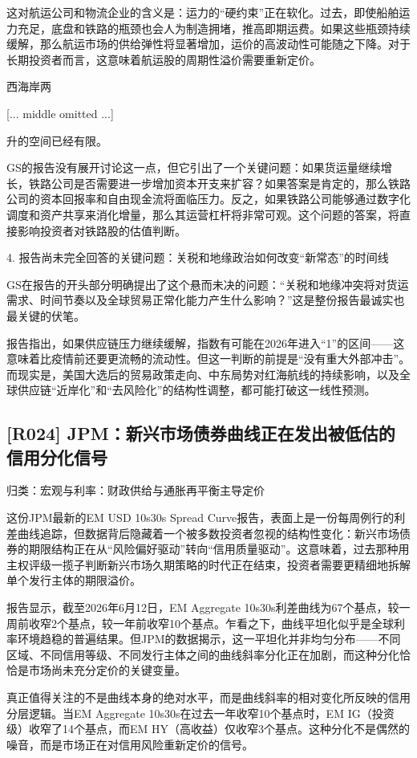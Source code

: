 \documentclass[11pt]{ctexart}
\begin{document}
这对航运公司和物流企业的含义是：运力的“硬约束”正在软化。过去，即使船舶运力充足，底盘和铁路的瓶颈也会人为制造拥堵，推高即期运费。如果这些瓶颈持续缓解，那么航运市场的供给弹性将显著增加，运价的高波动性可能随之下降。对于长期投资者而言，这意味着航运股的周期性溢价需要重新定价。

西海岸两

[... middle omitted ...]

升的空间已经有限。

GS的报告没有展开讨论这一点，但它引出了一个关键问题：如果货运量继续增长，铁路公司是否需要进一步增加资本开支来扩容？如果答案是肯定的，那么铁路公司的资本回报率和自由现金流将面临压力。反之，如果铁路公司能够通过数字化调度和资产共享来消化增量，那么其运营杠杆将非常可观。这个问题的答案，将直接影响投资者对铁路股的估值判断。

4. 报告尚未完全回答的关键问题：关税和地缘政治如何改变“新常态”的时间线

GS在报告的开头部分明确提出了这个悬而未决的问题：“关税和地缘冲突将对货运需求、时间节奏以及全球贸易正常化能力产生什么影响？”这是整份报告最诚实也最关键的伏笔。

报告指出，如果供应链压力继续缓解，指数有可能在2026年进入“1”的区间——这意味着比疫情前还要更流畅的流动性。但这一判断的前提是“没有重大外部冲击”。而现实是，美国大选后的贸易政策走向、中东局势对红海航线的持续影响，以及全球供应链“近岸化”和“去风险化”的结构性调整，都可能打破这一线性预测。

\subsection{[R024] JPM：新兴市场债券曲线正在发出被低估的信用分化信号}
{\small\color{refgray}归类：宏观与利率：财政供给与通胀再平衡主导定价}

这份JPM最新的EM USD 10s30s Spread Curve报告，表面上是一份每周例行的利差曲线追踪，但数据背后隐藏着一个被多数投资者忽视的结构性变化：新兴市场债券的期限结构正在从“风险偏好驱动”转向“信用质量驱动”。这意味着，过去那种用主权评级一揽子判断新兴市场久期策略的时代正在结束，投资者需要更精细地拆解单个发行主体的期限溢价。

报告显示，截至2026年6月12日，EM Aggregate 10s30s利差曲线为67个基点，较一周前收窄2个基点，较一年前收窄10个基点。乍看之下，曲线平坦化似乎是全球利率环境趋稳的普遍结果。但JPM的数据揭示，这一平坦化并非均匀分布——不同区域、不同信用等级、不同发行主体之间的曲线斜率分化正在加剧，而这种分化恰恰是市场尚未充分定价的关键变量。

真正值得关注的不是曲线本身的绝对水平，而是曲线斜率的相对变化所反映的信用分层逻辑。当EM Aggregate 10s30s在过去一年收窄10个基点时，EM IG（投资级）收窄了14个基点，而EM HY（高收益）仅收窄3个基点。这种分化不是偶然的噪音，而是市场正在对信用风险重新定价的信号。
\end{document}

